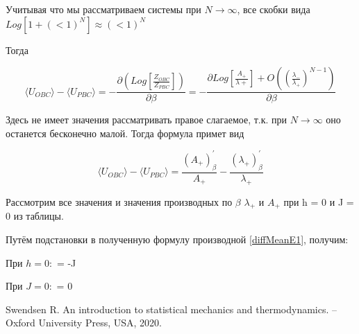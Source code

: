 \documentclass{article}
\newcommand{\lp}{\lambda_{+}}
\newcommand{\ap}{A_{+}}
\newcommand{\prpb}{^{'}_{\beta}}
\newcommand{\la}{\langle}
\newcommand{\ra}{\rangle}
\numberwithin{equation}{section}
\begin{document}
Учитывая что мы рассматриваем системы при $N \rightarrow \infty$,
все скобки вида $ Log[ 1 + (<1)^{N} ] \approx (<1)^{N} $ 

Тогда

\[ \la U_{OBC} \ra - \la U_{PBC} \ra =  -\frac{\partial ( Log[\frac{Z_{OBC}}{Z_{PBC}}])}{\partial \beta} = -\frac{\partial Log[\frac{A_{+}}{\lambda{+}}] + O((\frac{\lambda_{-}}{\lambda_{+}})^{N - 1})}{\partial \beta}\]

Здесь не имеет значения рассматривать правое слагаемое, т.к. при $N \to \infty$ оно останется бесконечно малой. Тогда формула примет вид 

\begin{equation}\label{diffMeanE1}
    \la U_{OBC} \ra - \la U_{PBC} \ra = \frac{(\ap)\prpb}{\ap} - \frac{(\lp)\prpb}{\lp}
\end{equation}

Рассмотрим все значения и значения производных по $\beta$ $ \lambda_{+}$ и $A_{+}$ при h = 0 и J = 0 из таблицы.

Путём подстановки в полученную формулу производной \eqref{diffMeanE1}, получим:

При $h = 0:$ = -J

При $J = 0:$ = 0 

\begin{thebibliography}{9}
 Swendsen R. An introduction to statistical mechanics and thermodynamics. – Oxford University Press, USA, 2020.
\end{thebibliography}
\end{document}
